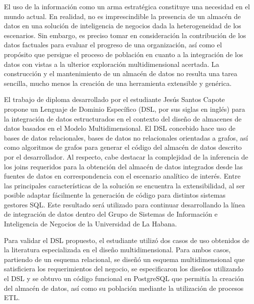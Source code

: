 \begin{opinion}
    El uso de la información como un arma estratégica constituye una necesidad en el mundo actual. En realidad, no es 
    imprescindible la presencia de un almacén de datos en una solución de inteligencia de negocios dada la 
    heterogeneidad de los escenarios. Sin embargo, es preciso tomar en consideración la contribución de los 
    datos factuales para evaluar el progreso de una organización, así como el propósito que persigue el 
    proceso de población en cuanto a la integración de los datos con vistas a la ulterior exploración 
    multidimensional acertada. La construcción y el mantenimiento de un almacén de datos no resulta 
    una tarea sencilla, mucho menos la creación de una herramienta extensible y genérica.

    El trabajo de diploma desarrollado por el estudiante Jesús Santos Capote propone un Lenguaje de 
    Dominio Específico (DSL, por sus siglas en inglés) para la integración de datos estructurados en el 
    contexto del diseño de almacenes de datos basados en el Modelo Multidimensional. El DSL concebido 
    hace uso de bases de datos relacionales, bases de datos no relacionales orientadas a grafos, así 
    como algoritmos de grafos para generar el código del almacén de datos descrito por el desarrollador. 
    Al respecto, cabe destacar la complejidad de la inferencia de los joins requeridos para la obtención 
    del almacén de datos integrados desde las fuentes de datos en correspondencia con el escenario 
    analítico de interés. Entre las principales características de la solución se encuentra la 
    extensibilidad, al ser posible adaptar fácilmente la generación de código para distintos sistemas 
    gestores SQL. Este resultado será utilizado para continuar desarrollando la línea de integración de 
    datos dentro del Grupo de Sistemas de Información e Inteligencia de Negocios de la Universidad de 
    La Habana.

    Para validar el DSL propuesto, el estudiante utilizó dos casos de uso obtenidos de la literatura 
    especializada en el diseño multidimensional. Para ambos casos, partiendo de un esquema relacional, 
    se diseñó un esquema multidimensional que satisficiera los requerimientos del negocio, se especificaron 
    los diseños utilizando el DSL y se obtuvo un código funcional en PostgreSQL que permitía la creación 
    del almacén de datos, así como su población mediante la utilización de procesos ETL.


\end{opinion}
